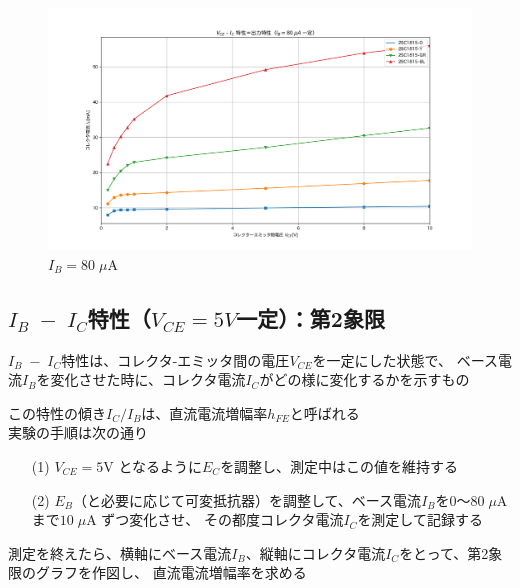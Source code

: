 \documentclass[uplatex,a4paper,11pt,oneside,openany]{jsbook}
\begin{document}
\begin{figure}[H]
  \centering
   \includegraphics[keepaspectratio, scale=0.48, angle=0]
             {figs/png/staticE01Ib80.png}
             \caption{$I_B=80\;\mu$A}
             \label{fig:ex014}
\end{figure}

\newpage

\subsection{$I_B\;-\;I_C$特性（$V_{CE}=5V$一定）：第2象限}

$I_B\;-\;I_C$特性は、コレクタ-エミッタ間の電圧$V_{CE}$を一定にした状態で、
ベース電流$I_B$を変化させた時に、コレクタ電流$I_C$がどの様に変化するかを示すもの

この特性の傾き$I_C/I_B$は、直流電流増幅率$h_{FE}$と呼ばれる\\

実験の手順は次の通り

\begin{enumerate}
\item[(1)] $V_{CE}=5$V となるように$E_C$を調整し、測定中はこの値を維持する
\item[(2)] $E_B$（と必要に応じて可変抵抗器）を調整して、ベース電流$I_B$を$0$〜$80\;\mu$A まで$10\;\mu$A ずつ変化させ、
その都度コレクタ電流$I_C$を測定して記録する 
\end{enumerate}

測定を終えたら、横軸にベース電流$I_B$、縦軸にコレクタ電流$I_C$をとって、第2象限のグラフを作図し、
直流電流増幅率を求める

\vfill
\end{document}
